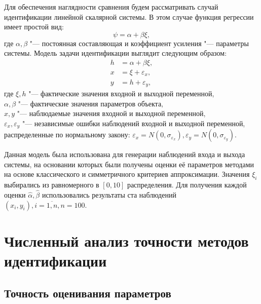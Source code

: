 Для обеспечения наглядности сравнения будем рассматривать случай
идентификации линейной скалярной системы.
В этом случае функция регрессии имеет простой вид:
\begin{equation}
  \psi = \alpha + \beta \xi,
  \label{eq:linear_fun_scalar}
\end{equation}
где \( \alpha, \beta \) "--- постоянная составляющая и коэффициент усиления "---
параметры системы. Модель задачи идентификации выглядит следующим образом:
\begin{equation}
  \label{eq:linear_model_scalar}
  \begin{aligned}
  h &= \alpha + \beta \xi, \\
  x &= \xi + \varepsilon_x, \\
  y &= h + \varepsilon_y,
  \end{aligned}
\end{equation}
где \( \xi, h \) "--- фактические значения входной и выходной переменной, \\
\hspace*{6mm} \( \alpha, \beta \) "--- фактические значения параметров объекта, \\
\hspace*{6mm} \( x, y \) "--- наблюдаемые значения входной и выходной переменной, \\
\hspace*{5mm} \( \varepsilon_x, \varepsilon_y \) "--- независимые ошибки наблюдений
входной и выходной переменной, распределенные по нормальному закону:
\(
\varepsilon_x = N(0, \sigma_{\varepsilon_x}),
\varepsilon_y = N(0, \sigma_{\varepsilon_y})
\).

Данная модель была использована для генерации наблюдений входа и выхода системы,
на основании которых были получены оценки её параметров методами на основе
классического и симметричного критериев аппроксимации.
Значения \( \xi_i \) выбирались из равномерного в \( [0, 10] \) распределения.
Для получения каждой оценки \( \hat{\alpha}, \hat{\beta} \) использовались результаты
ста наблюдений \( ( x_i, y_i ), i = \overline{1, n}, n = 100 \).

\section{Численный анализ точности методов идентификации}

\subsection{Точность оценивания параметров}

